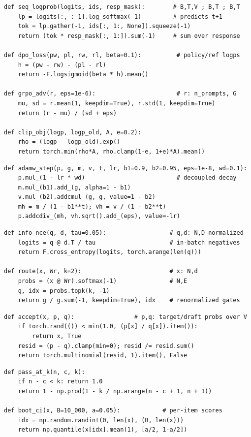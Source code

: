 \begin{lstlisting}
def seq_logprob(logits, ids, resp_mask):        # B,T,V ; B,T ; B,T
    lp = logits[:, :-1].log_softmax(-1)         # predicts t+1
    tok = lp.gather(-1, ids[:, 1:, None]).squeeze(-1)
    return (tok * resp_mask[:, 1:]).sum(-1)     # sum over response

def dpo_loss(pw, pl, rw, rl, beta=0.1):          # policy/ref logps
    h = (pw - rw) - (pl - rl)
    return -F.logsigmoid(beta * h).mean()

def grpo_adv(r, eps=1e-6):                       # r: n_prompts, G
    mu, sd = r.mean(1, keepdim=True), r.std(1, keepdim=True)
    return (r - mu) / (sd + eps)

def clip_obj(logp, logp_old, A, e=0.2):
    rho = (logp - logp_old).exp()
    return torch.min(rho*A, rho.clamp(1-e, 1+e)*A).mean()
\end{lstlisting}

\begin{lstlisting}
def adamw_step(p, g, m, v, t, lr, b1=0.9, b2=0.95, eps=1e-8, wd=0.1):
    p.mul_(1 - lr * wd)                          # decoupled decay
    m.mul_(b1).add_(g, alpha=1 - b1)
    v.mul_(b2).addcmul_(g, g, value=1 - b2)
    mh = m / (1 - b1**t); vh = v / (1 - b2**t)
    p.addcdiv_(mh, vh.sqrt().add_(eps), value=-lr)
\end{lstlisting}

\begin{lstlisting}
def info_nce(q, d, tau=0.05):                  # q,d: N,D normalized
    logits = q @ d.T / tau                     # in-batch negatives
    return F.cross_entropy(logits, torch.arange(len(q)))

def route(x, Wr, k=2):                         # x: N,d
    probs = (x @ Wr).softmax(-1)               # N,E
    g, idx = probs.topk(k, -1)
    return g / g.sum(-1, keepdim=True), idx    # renormalized gates
\end{lstlisting}

\begin{lstlisting}
def accept(x, p, q):                 # p,q: target/draft probs over V
    if torch.rand(()) < min(1.0, (p[x] / q[x]).item()):
        return x, True
    resid = (p - q).clamp(min=0); resid /= resid.sum()
    return torch.multinomial(resid, 1).item(), False
\end{lstlisting}

\begin{lstlisting}
def pass_at_k(n, c, k):
    if n - c < k: return 1.0
    return 1 - np.prod(1 - k / np.arange(n - c + 1, n + 1))

def boot_ci(x, B=10_000, a=0.05):            # per-item scores
    idx = np.random.randint(0, len(x), (B, len(x)))
    return np.quantile(x[idx].mean(1), [a/2, 1-a/2])
\end{lstlisting}
